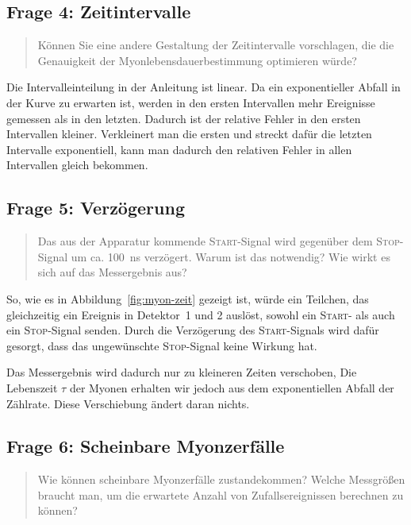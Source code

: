\documentclass[11pt, ngerman, fleqn, DIV=15, headinclude, BCOR=2cm]{scrreprt}
\begin{document}
\subsection{Frage 4: Zeitintervalle}

\begin{quote}
    Können Sie eine andere Gestaltung der Zeitintervalle vorschlagen, die die
    Genauigkeit der Myonlebensdauerbestimmung optimieren würde?
\end{quote}

Die Intervalleinteilung in der Anleitung ist linear. Da ein exponentieller
Abfall in der Kurve zu erwarten ist, werden in den ersten Intervallen mehr
Ereignisse gemessen als in den letzten. Dadurch ist der relative Fehler in den
ersten Intervallen kleiner. Verkleinert man die ersten und streckt dafür die
letzten Intervalle exponentiell, kann man dadurch den relativen Fehler in allen
Intervallen gleich bekommen.

\subsection{Frage 5: Verzögerung}

\begin{quote}
    Das aus der Apparatur kommende \textsc{Start}-Signal wird gegenüber dem
    \textsc{Stop}-Signal um ca. \SI{100}{\nano\second} verzögert. Warum ist das
    notwendig? Wie wirkt es sich auf das Messergebnis aus?
\end{quote}

So, wie es in Abbildung~\ref{fig:myon-zeit} gezeigt ist, würde ein Teilchen,
das gleichzeitig ein Ereignis in Detektor~1 und 2 auslöst, sowohl ein
\textsc{Start}- als auch ein \textsc{Stop}-Signal senden. Durch die Verzögerung
des \textsc{Start}-Signals wird dafür gesorgt, dass das ungewünschte
\textsc{Stop}-Signal keine Wirkung hat.

Das Messergebnis wird dadurch nur zu kleineren Zeiten verschoben, Die
Lebenszeit $\tau$ der Myonen erhalten wir jedoch aus dem exponentiellen Abfall
der Zählrate. Diese Verschiebung ändert daran nichts.

\subsection{Frage 6: Scheinbare Myonzerfälle}

\begin{quote}
    Wie können scheinbare Myonzerfälle zustandekommen? Welche Messgrößen
    braucht man, um die erwartete Anzahl von Zufallsereignissen berechnen zu
    können?
\end{quote}
\end{document}
